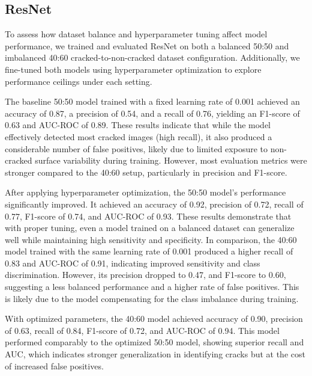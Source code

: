 \subsection{ResNet}

To assess how dataset balance and hyperparameter tuning affect model performance, we trained and evaluated ResNet on both a balanced 50:50 and imbalanced 40:60 cracked-to-non-cracked dataset configuration. Additionally, we fine-tuned both models using hyperparameter optimization to explore performance ceilings under each setting.

The baseline 50:50 model trained with a fixed learning rate of 0.001 achieved an accuracy of 0.87, a precision of 0.54, and a recall of 0.76, yielding an F1-score of 0.63 and AUC-ROC of 0.89. These results indicate that while the model effectively detected most cracked images (high recall), it also produced a considerable number of false positives, likely due to limited exposure to non-cracked surface variability during training. However, most evaluation metrics were stronger compared to the 40:60 setup, particularly in precision and F1-score.

After applying hyperparameter optimization, the 50:50 model’s performance significantly improved. It achieved an accuracy of 0.92, precision of 0.72, recall of 0.77, F1-score of 0.74, and AUC-ROC of 0.93. These results demonstrate that with proper tuning, even a model trained on a balanced dataset can generalize well while maintaining high sensitivity and specificity.
In comparison, the 40:60 model trained with the same learning rate of 0.001 produced a higher recall of 0.83 and AUC-ROC of 0.91, indicating improved sensitivity and class discrimination. However, its precision dropped to 0.47, and F1-score to 0.60, suggesting a less balanced performance and a higher rate of false positives. This is likely due to the model compensating for the class imbalance during training.

With optimized parameters, the 40:60 model achieved accuracy of 0.90, precision of 0.63, recall of 0.84, F1-score of 0.72, and AUC-ROC of 0.94. This model performed comparably to the optimized 50:50 model, showing superior recall and AUC, which indicates stronger generalization in identifying cracks but at the cost of increased false positives.

